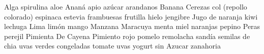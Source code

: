 Alga spirulina
aloe 
Ananá 
apio 
azúcar
arandanos
Banana 
Cerezas 
col (repollo colorado)
espinaca
estevia 
frambuesas
frutilla
hielo 
jengibre
Jugo de naranja
kiwi 
lechuga
Lima
limón 
mango
Manzana 
Maracuya
menta
miel
naranjas 
pepino 
Peras
perejil 
Pimienta De Cayena
Pimiento rojo
pomelo
remolacha 
sandía
semilas de chia
uvas verdes congeladas
tomate 
uvas
yogurt sin Azucar
zanahoria 